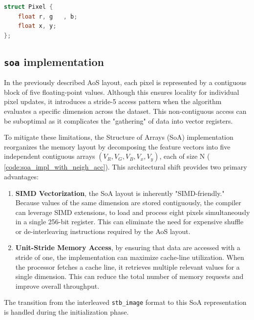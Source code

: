 \documentclass[10pt,twocolumn,letterpaper]{article}
\begin{document}
\begin{lstlisting}[language=C++, caption={seq spatial save into pixel struct}, label={code:aos_spatial_mem}]
struct Pixel {
    float r, g   , b;
    float x, y; 
};
\end{lstlisting}

\subsection{\texttt{soa} implementation}\label{subsec: SoA}
In the previously described AoS layout, each pixel is represented by a contiguous block of five floating-point values. Although this ensures locality for individual pixel updates, it introduces a stride-5 access pattern when the algorithm evaluates a specific dimension across the dataset.  This non-contiguous access can be suboptimal as it complicates the "gathering" of data into vector registers.

To mitigate these limitations, the Structure of Arrays (SoA) implementation reorganizes the memory layout by decomposing the feature vectors into five independent contiguous arrays $(V_R,V_G,V_B,V_x,V_y)$, each of size N ( \cref{code:soa_impl_with_neigh_acc}). This architectural shift provides two primary advantages:
\begin{enumerate}
\item \textbf{SIMD Vectorization}, the SoA layout is inherently "SIMD-friendly." Because values of the same dimension are stored contiguously, the compiler can leverage SIMD extensions,  to load and process eight pixels simultaneously in a single 256-bit register. This can eliminate the need for expensive shuffle or de-interleaving instructions required by the AoS layout.
\item \textbf{Unit-Stride Memory Access}, by ensuring that data are accessed with a stride of one, the implementation can maximize cache-line utilization. When the processor fetches a cache line, it retrieves multiple relevant values for a single dimension. This can reduce the total number of memory requests and improve overall throughput.
\end{enumerate}
The transition from the interleaved \texttt{stb\_image} format to this SoA representation is handled during the initialization phase. 
\end{document}
